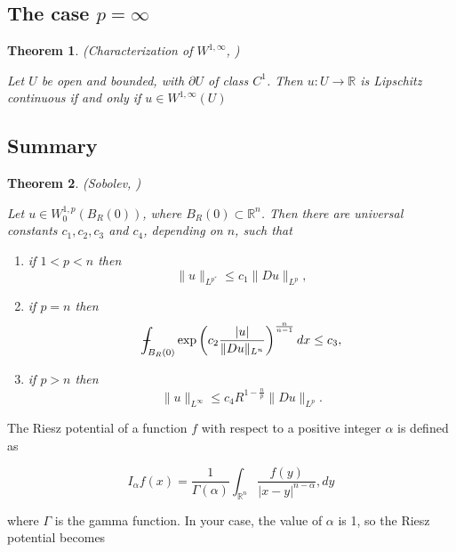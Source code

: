 \documentclass[11pt,a4paper]{report}
\newtheorem{theorem}{Theorem}[section]
\theoremstyle{definition}
\def\Xint#1{\mathchoice
{\XXint\displaystyle\textstyle{#1}}%
{\XXint\textstyle\scriptstyle{#1}}%
{\XXint\scriptstyle\scriptscriptstyle{#1}}%
{\XXint\scriptscriptstyle\scriptscriptstyle{#1}}%
\!\int}
\def\XXint#1#2#3{{\setbox0=\hbox{$#1{#2#3}{\int}$}
\vcenter{\hbox{$#2#3$}}\kern-.5\wd0}}
\def\dashint{\Xint-}
\begin{document}
\subsection{The case $p = \infty$}

\begin{theorem}
	\emph{(Characterization of $W^{1, \infty}$, \cite{2010_Evans})}

	Let $U$ be open and bounded, with $\partial U$ of class $C^1$. 
    Then $u: U \rightarrow \mathbb{R}$ is Lipschitz continuous if and only if $u \in W^{1, \infty}(U)$
\end{theorem}

\subsection{Summary}


\begin{theorem}
	\emph{(Sobolev, \cite[Theorem 7.29]{2012_Giaquinta})}

	Let $u \in W_0^{1, p}\left(B_R(0)\right)$, where $B_R(0) \subset \mathbb{R}^n$. Then there are universal constants $c_1, c_2, c_3$ and $c_4$, depending on $n$, such that
	\begin{enumerate}[label=(\alph*)] 
	\rm\item if $1<p<n$ then 
	\begin{equation*} 
		\|u\|_{L^{p^*}} \leq c_1\|D u\|_{L^p},
	\end{equation*}
	\rm\item if $p = n$ then 
	\begin{equation*} 
		\dashint_{B_R(0)} \exp \left(c_2 \frac{|u|}{\|D u\|_{L^n}}\right)^{\frac{n}{n-1}} d x \leq c_3,
	\end{equation*}
	\rm\item if $p>n$ then 
	\begin{equation*} 
		\|u\|_{L^{\infty}} \leq c_4 R^{1-\frac{n}{p}}\|D u\|_{L^p}.
	\end{equation*}
	\end{enumerate}
\end{theorem}


The Riesz potential of a function $f$ with respect to a positive integer $\alpha$ is defined as

$$I_\alpha f(x) = \frac{1}{\Gamma(\alpha)} \int_{\mathbb{R}^n} \frac{f(y)}{|x-y|^{n-\alpha}} ,dy$$

where $\Gamma$ is the gamma function. In your case, the value of $\alpha$ is 1, so the Riesz potential becomes
\end{document}
